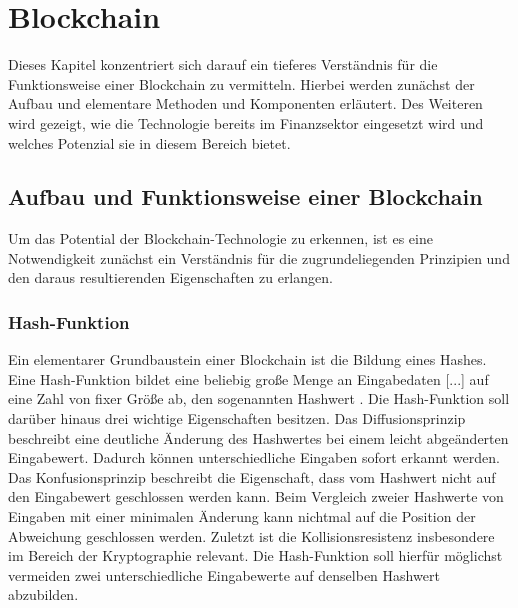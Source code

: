 \section{Blockchain}
Dieses Kapitel konzentriert sich darauf ein tieferes Verständnis für die Funktionsweise einer Blockchain
zu vermitteln. Hierbei werden zunächst der Aufbau und elementare Methoden und Komponenten erläutert.
Des Weiteren wird gezeigt, wie die Technologie bereits im Finanzsektor eingesetzt wird und welches Potenzial
sie in diesem Bereich bietet.


\subsection{Aufbau und Funktionsweise einer Blockchain}
Um das Potential der Blockchain-Technologie zu erkennen, ist es eine Notwendigkeit zunächst ein Verständnis 
für die zugrundeliegenden Prinzipien und den daraus resultierenden Eigenschaften zu erlangen.





\subsubsection{Hash-Funktion}
Ein elementarer Grundbaustein einer Blockchain ist die Bildung eines Hashes.
\glqq Eine Hash-Funktion bildet eine beliebig gro\ss e Menge an Eingabedaten [...] auf eine Zahl von 
fixer Grö\ss e ab, den sogenannten Hashwert\grqq{} \cite[p.~6]{fill2020blockchain}.
Die Hash-Funktion soll darüber hinaus drei wichtige Eigenschaften besitzen.
Das Diffusionsprinzip beschreibt eine deutliche Änderung des Hashwertes bei einem leicht
abgeänderten Eingabewert. Dadurch können unterschiedliche Eingaben sofort erkannt werden.
Das Konfusionsprinzip beschreibt die Eigenschaft, dass vom Hashwert nicht auf den Eingabewert
geschlossen werden kann. Beim Vergleich zweier Hashwerte von Eingaben mit einer minimalen
Änderung kann nichtmal auf die Position der Abweichung geschlossen werden.
Zuletzt ist die Kollisionsresistenz insbesondere im Bereich der Kryptographie relevant.
Die Hash-Funktion soll hierfür möglichst vermeiden zwei unterschiedliche Eingabewerte
auf denselben Hashwert abzubilden.
\cite[p.~6ff]{fill2020blockchain} 

